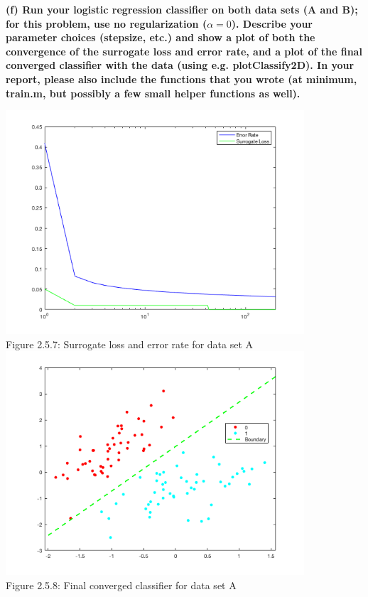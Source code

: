 \documentclass[]{scrreprt}   %
\begin{document}
\bigbreak
\textbf{(f) Run your logistic regression classifier on both data sets (A and B); for this problem, use no regularization ($\alpha = 0$). Describe your parameter choices (stepsize, etc.) and show a plot of both the convergence of the surrogate loss and error rate, and a plot of the final converged classifier with the data (using e.g. plotClassify2D). In your report, please also include the functions that you wrote (at minimum, train.m, but possibly a few small helper functions as well).}

\begin{center}
	\includegraphics[width=30em,keepaspectratio]{p5figure7.png}\\
	{Figure 2.5.7: Surrogate loss and error rate for data set A}
	\includegraphics[width=30em,keepaspectratio]{p5figure8.png}\\
	{Figure 2.5.8: Final converged classifier for data set A}

\end{center}
\end{document}
